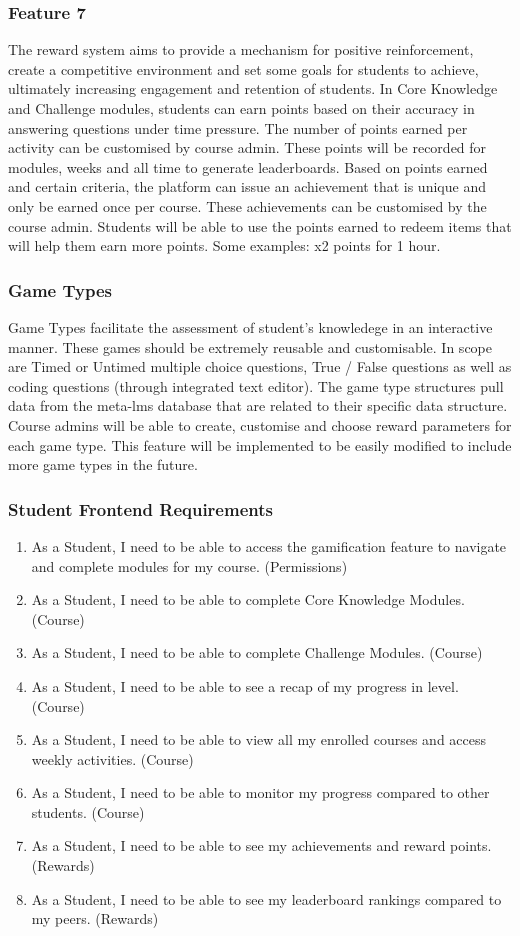 \subsubsection{Feature 7}
The reward system aims to provide a mechanism for positive reinforcement, create a competitive environment and set some goals for students to achieve, ultimately increasing engagement and retention of students.
In Core Knowledge and Challenge modules, students can earn points based on their accuracy in answering questions under time pressure. The number of points earned per activity can be customised by course admin. These points will be recorded for modules, weeks and all time to generate leaderboards. Based on points earned and certain criteria, the platform can issue an achievement that is unique and only be earned once per course. These achievements can be customised by the course admin. Students will be able to use the points earned to redeem items that will help them earn more points. Some examples: x2 points for 1 hour. 

\subsubsection{Game Types}
Game Types facilitate the assessment of student's knowledege in an interactive manner. These games should be extremely reusable and customisable.
In scope are Timed or Untimed multiple choice questions, True / False questions as well as coding questions (through integrated text editor). The game type structures pull data from the meta-lms database that are related to their specific data structure. Course admins will be able to create, customise and choose reward parameters for each game type. This feature will be implemented to be easily modified to include more game types in the future.

\subsubsection{Student Frontend Requirements}
\begin{enumerate}
    \item As a Student, I need to be able to access the gamification feature to navigate and complete modules for my course. (Permissions)
    \item As a Student, I need to be able to complete Core Knowledge Modules. (Course)
    \item As a Student, I need to be able to complete Challenge Modules. (Course)
    \item As a Student, I need to be able to see a recap of my progress in level. (Course)
    \item As a Student, I need to be able to view all my enrolled courses and access weekly activities. (Course)
    \item As a Student, I need to be able to monitor my progress compared to other students. (Course)
    \item As a Student, I need to be able to see my achievements and reward points. (Rewards)
    \item As a Student, I need to be able to see my leaderboard rankings compared to my peers. (Rewards)
\end{enumerate}

